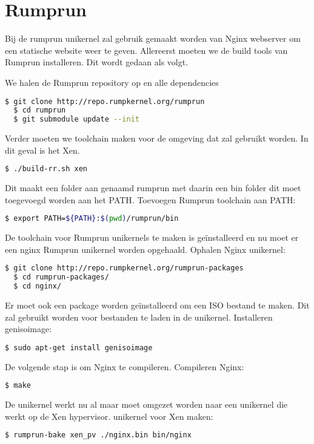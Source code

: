 \section{Rumprun}

Bij de rumprun unikernel zal gebruik gemaakt worden van Nginx webserver om een statische website weer te geven. 
Allereerst moeten we de build tools van Rumprun installeren.
Dit wordt gedaan als volgt.

\noindent We halen de Rumprun repository op en alle dependencies
\begin{lstlisting}[language=bash]
  $ git clone http://repo.rumpkernel.org/rumprun
  $ cd rumprun
  $ git submodule update --init
\end{lstlisting}

Verder moeten we toolchain maken voor de omgeving dat zal gebruikt worden. In dit geval is het Xen.
\begin{lstlisting}[language=bash]
  $ ./build-rr.sh xen
\end{lstlisting}

Dit maakt een folder aan genaamd rumprun met daarin een bin folder dit moet toegevoegd worden aan het PATH.
\noindent Toevoegen Rumprun toolchain aan PATH:
\begin{lstlisting}[language=bash]
  $ export PATH=${PATH}:$(pwd)/rumprun/bin
\end{lstlisting}

De toolchain voor Rumprun unikernels te maken is geïnstalleerd en nu moet er een nginx Rumprun unikernel worden opgehaald.
\noindent Ophalen Nginx unikernel:
\begin{lstlisting}[language=bash]
  $ git clone http://repo.rumpkernel.org/rumprun-packages
  $ cd rumprun-packages/
  $ cd nginx/
\end{lstlisting}

Er moet ook een package worden geïnstalleerd om een ISO bestand te maken. Dit zal gebruikt worden voor bestanden te laden in de unikernel.
\noindent Installeren genisoimage:
\begin{lstlisting}[language=bash]
  $ sudo apt-get install genisoimage
\end{lstlisting}

De volgende stap is om Nginx te compileren.
\noindent Compileren Nginx:
\begin{lstlisting}[language=bash]
  $ make
\end{lstlisting}

De unikernel werkt nu al maar moet omgezet worden naar een unikernel die werkt op de Xen hypervisor.
\noindent unikernel voor Xen maken:
\begin{lstlisting}[language=bash]
  $ rumprun-bake xen_pv ./nginx.bin bin/nginx
\end{lstlisting}

